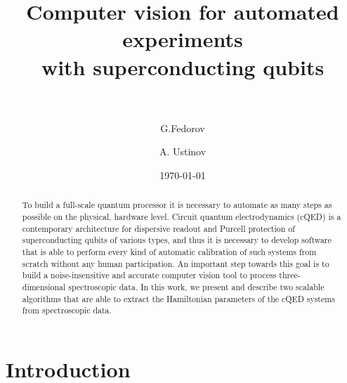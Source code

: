 \documentclass[%
 aip,
 amsmath,amssymb,
 reprint,%
]{revtex4-1}
\begin{document}

\title[Computer vision for automated experiments with superconducting qubits]{Computer vision for automated experiments\\  with superconducting qubits\\~}

\author{G.Fedorov}

%
%

\author{A. Ustinov}
%
%

\date{\today}%

\begin{abstract}
To build a full-scale quantum processor it is necessary to automate as many steps as possible on the physical, hardware level. Circuit quantum electrodynamics (cQED) is a contemporary architecture for dispersive readout and Purcell protection of superconducting qubits of various types, and thus it is necessary to develop software that is able to perform every kind of automatic calibration of such systems from scratch without any human participation. An important step towards this goal is to build a noise-insensitive and accurate computer vision tool to process three-dimensional spectroscopic data. In this work, we present and describe two scalable algorithms that are able to extract the Hamiltonian parameters of the cQED systems from spectroscopic data. 
\end{abstract}

\maketitle

 \renewcommand*{\figureautorefname}{Fig.}

\section{\label{sec:level1} Introduction}
\end{document}
